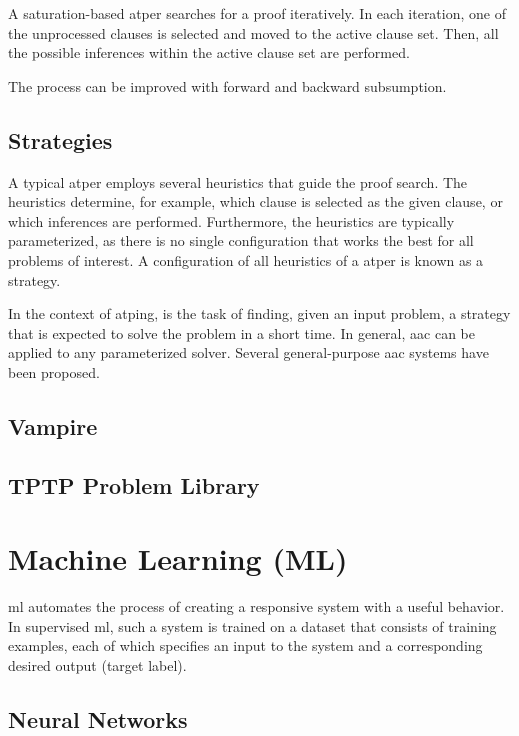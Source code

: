 A saturation-based \gls{atper} searches for a proof iteratively.
In each iteration, one of the unprocessed clauses is selected and moved to the active clause set.
Then, all the possible inferences within the active clause set are performed.

The process can be improved with forward and backward subsumption.

\subsection{Strategies}

A typical \gls{atper} employs several heuristics that guide the proof search.
The heuristics determine, for example, which clause is selected as the given clause, or which inferences are performed.
Furthermore, the heuristics are typically parameterized, as there is no single configuration that works the best for all problems of interest.
A configuration of all heuristics of a \gls{atper} is known as a strategy.

In the context of \gls{atping},  is the task of finding, given an input problem, a strategy that is expected to solve the problem in a short time.
In general, \gls{aac} can be applied to any parameterized solver.
Several general-purpose \gls{aac} systems have been proposed.

\subsection{Vampire}

\subsection{TPTP Problem Library}

\section{Machine Learning (ML)}

\Gls{ml} automates the process of creating a responsive system with a useful behavior.
In supervised \gls{ml}, such a system is trained on a dataset that consists of training examples,
each of which specifies an input to the system and a corresponding desired output (target label).

\subsection{Neural Networks}

